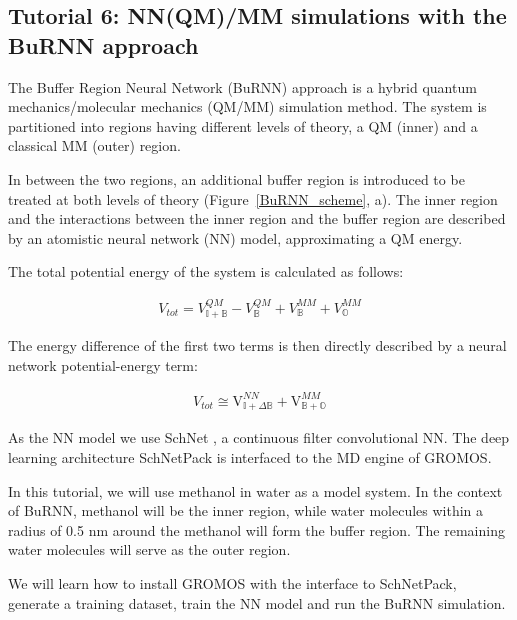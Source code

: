
\subsection{Tutorial 6: NN(QM)/MM simulations with the BuRNN approach}
The Buffer Region Neural Network (BuRNN) approach \cite{Lier2022BuRNN} is a hybrid quantum mechanics/molecular mechanics (QM/MM) \cite{Warshel1976QM/MM, Senn2009QM/MM} simulation method. The system is partitioned into regions having different levels of theory, a QM (inner) and a classical MM (outer) region. 

In between the two regions, an additional buffer region is introduced to be treated at both levels of theory (Figure~\ref{BuRNN_scheme}, a). The inner region and the interactions between the inner region and the buffer region are described by an atomistic neural network (NN) model, approximating a QM energy.

The total potential energy of the system is calculated as follows:

\begin{equation}
  \begin{aligned}
  V_{tot} = V^{QM}_{\mathbb{I+B}} - V^{QM}_{\mathbb{B}} + V^{MM}_{\mathbb{B}} + V^{MM}_{\mathbb{O}}
    \end{aligned}
\end{equation}


 The energy difference of the first two terms is then directly described by a neural network potential-energy term: 
 
\begin{equation}
  \begin{aligned}
  V_{tot} \cong \mathrm{V}_{\mathbb{I+}\Delta\mathbb{B}}^{NN} + \mathrm{V}_{\mathbb{B+O}}^{MM}
    \end{aligned}
\end{equation}


As the NN model we use SchNet \cite{Schuett2017SchNet, Schuett2018SchNet}, a continuous filter convolutional NN. The deep learning architecture SchNetPack \cite{Schuett2019SPK} is interfaced to the MD engine of GROMOS.


In this tutorial, we will use methanol in water as a model system. In the context of BuRNN, methanol will be the inner region, while water molecules within a radius of 0.5 nm around the methanol will form the buffer region. The remaining water molecules will serve as the outer region. 

We will learn how to install GROMOS with the interface to SchNetPack, generate a training dataset, train the NN model and run the BuRNN simulation.

